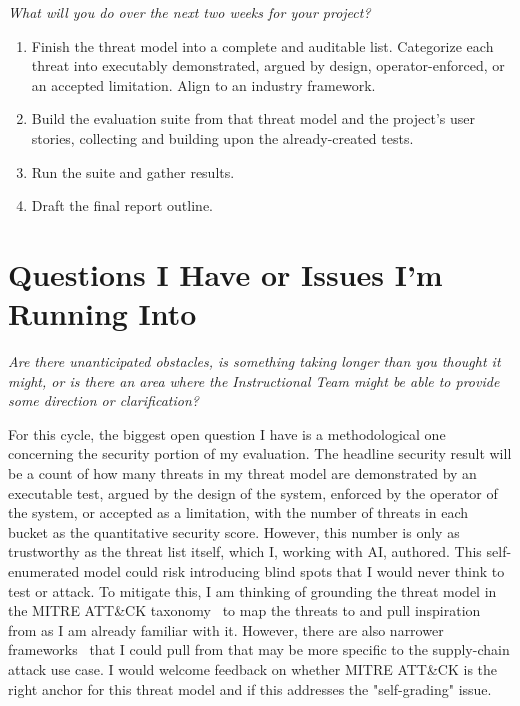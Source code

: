 \documentclass[12pt]{article}
\newcommand{\instruction}[1]{{\small\itshape #1}}
\begin{document}
\instruction{What will you do over the next two weeks for your project?}

\begin{enumerate}[leftmargin=1.5em, itemsep=2pt]
  \item Finish the threat model into a complete and auditable list. Categorize each threat into executably demonstrated, argued by design, operator-enforced, or an accepted limitation. Align to an industry framework.
  \item Build the evaluation suite from that threat model and the project's user stories, collecting and building upon the already-created tests.
  \item Run the suite and gather results.
  \item Draft the final report outline.
\end{enumerate}

\section*{Questions I Have or Issues I'm Running Into}

\instruction{Are there unanticipated obstacles, is something taking longer than you thought it might, or is there an area where the Instructional Team might be able to provide some direction or clarification?}

For this cycle, the biggest open question I have is a methodological one concerning the security portion of my evaluation. The headline security result will be a count of how many threats in my threat model are demonstrated by an executable test, argued by the design of the system, enforced by the operator of the system, or accepted as a limitation, with the number of threats in each bucket as the quantitative security score. However, this number is only as trustworthy as the threat list itself, which I, working with AI, authored. This self-enumerated model could risk introducing blind spots that I would never think to test or attack. To mitigate this, I am thinking of grounding the threat model in the MITRE ATT\&CK taxonomy~\cite{mitre-attack} to map the threats to and pull inspiration from as I am already familiar with it. However, there are also narrower frameworks~\cite{cncf-supply-chain-catalog,slsa} that I could pull from that may be more specific to the supply-chain attack use case. I would welcome feedback on whether MITRE ATT\&CK is the right anchor for this threat model and if this addresses the "self-grading" issue.
\end{document}

